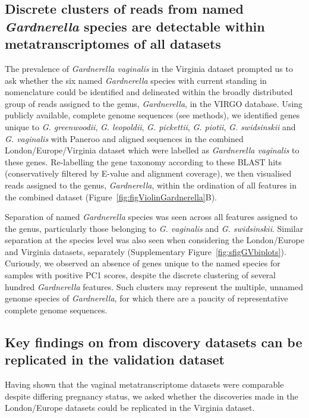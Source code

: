\documentclass[sn-mathphys,Numbered]{sn-jnl}%
\begin{document}
\subsection{Discrete clusters of reads from named \textit{Gardnerella} species are detectable within metatranscriptomes of all datasets}\label{subsec:subsecGardnerella}

The prevalence of \textit{Gardnerella vaginalis} in the Virginia dataset prompted us to ask whether the six named \textit{Gardnerella} species with current standing in nomenclature\citep{vaneechoutte_emended_2019, sousa_gardSpp_2023} could be identified and delineated within the broadly distributed group of reads assigned to the genus, \textit{Gardnerella}, in the VIRGO database. Using publicly available, complete genome sequences (see methods), we identified genes unique to \textit{G. greenwoodii}, \textit{G. leopoldii}, \textit{G. pickettii}, \textit{G. piotii}, \textit{G. swidsinskii} and \textit{G. vaginalis} with Paneroo \citep{Tonkin-Hill:2020aa} and aligned sequences in the combined London/Europe/Virginia dataset which were labelled as \textit{Gardnerella vaginalis} to these genes. Re-labelling the gene taxonomy according to these BLAST hits (conservatively filtered by E-value and alignment coverage), we then visualised reads assigned to the genus, \textit{Gardnerella}, within the ordination of all features in the combined dataset (Figure~\ref{fig:figViolinGardnerella}B).

Separation of named \textit{Gardnerella} species was seen across all features assigned to the genus, particularly those belonging to \textit{G. vaginalis} and \textit{G. swidsinskii}. Similar separation at the species level was also seen when considering the London/Europe and Virginia datasets, separately (Supplementary Figure~\ref{fig:sfigGVbiplots}). Curiously, we observed an absence of genes unique to the named species for samples with positive PC1 scores, despite the discrete clustering of several hundred \textit{Gardnerella} features. Such clusters may represent the multiple, unnamed genome species of \textit{Gardnerella}, for which there are a paucity of representative complete genome sequences.

\subsection{Key findings on from discovery datasets can be replicated in the validation dataset} \label{subsec:subsecValidation}

Having shown that the vaginal metatranscriptome datasets were comparable despite differing pregnancy status, we asked whether the discoveries made in the London/Europe datasets could be replicated in the Virginia dataset.
\end{document}
